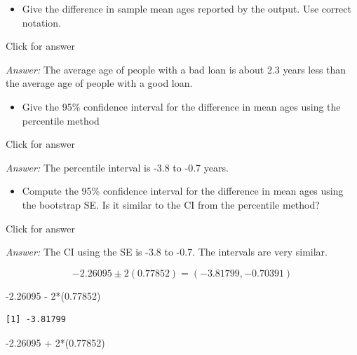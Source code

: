 \documentclass[
]{book}
\newenvironment{Shaded}{\begin{snugshade}}{\end{snugshade}}
\newcommand{\DecValTok}[1]{\textcolor[rgb]{0.00,0.00,0.81}{#1}}
\newcommand{\FloatTok}[1]{\textcolor[rgb]{0.00,0.00,0.81}{#1}}
\newcommand{\NormalTok}[1]{#1}
\newcommand{\SpecialCharTok}[1]{\textcolor[rgb]{0.00,0.00,0.00}{#1}}
\providecommand{\tightlist}{%
  \setlength{\itemsep}{0pt}\setlength{\parskip}{0pt}}
\begin{document}
\begin{itemize}
\tightlist
\item
  Give the difference in sample mean ages reported by the output. Use correct notation.
\end{itemize}

Click for answer

\emph{Answer:} The average age of people with a bad loan is about 2.3 years less than the average age of people with a good loan.

\begin{itemize}
\tightlist
\item
  Give the 95\% confidence interval for the difference in mean ages using the percentile method
\end{itemize}

Click for answer

\emph{Answer:} The percentile interval is -3.8 to -0.7 years.

\begin{itemize}
\tightlist
\item
  Compute the 95\% confidence interval for the difference in mean ages using the bootstrap SE. Is it similar to the CI from the percentile method?
\end{itemize}

Click for answer

\emph{Answer:} The CI using the SE is -3.8 to -0.7. The intervals are very similar.

\[
-2.26095 \pm 2(0.77852) = (-3.81799,  -0.70391)
\]

\begin{Shaded}
\begin{Highlighting}[]
\SpecialCharTok{{-}}\FloatTok{2.26095} \SpecialCharTok{{-}} \DecValTok{2}\SpecialCharTok{*}\NormalTok{(}\FloatTok{0.77852}\NormalTok{)}
\end{Highlighting}
\end{Shaded}

\begin{verbatim}
[1] -3.81799
\end{verbatim}

\begin{Shaded}
\begin{Highlighting}[]
\SpecialCharTok{{-}}\FloatTok{2.26095} \SpecialCharTok{+} \DecValTok{2}\SpecialCharTok{*}\NormalTok{(}\FloatTok{0.77852}\NormalTok{)}
\end{Highlighting}
\end{Shaded}
\end{document}
